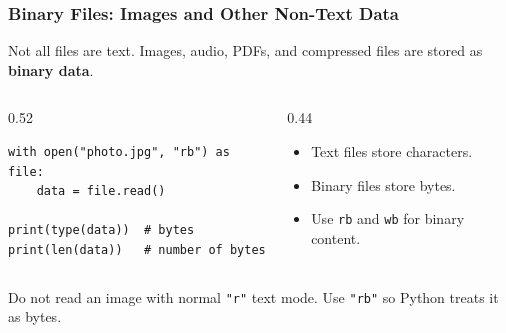 \documentclass[aspectratio=169,10pt]{beamer}
\newcommand{\keyword}[1]{\textcolor{PrimaryBlue}{\textbf{#1}}}
\newcommand{\codeword}[1]{\texttt{#1}}
\begin{document}
\begin{frame}[fragile]
\frametitle{Binary Files: Images and Other Non-Text Data}
\small
Not all files are text. Images, audio, PDFs, and compressed files are stored as \keyword{binary data}.

\vspace{0.15cm}
\begin{columns}[T,totalwidth=0.96\textwidth]
\begin{column}{0.52\textwidth}
\begin{lstlisting}[style=pycode]
with open("photo.jpg", "rb") as file:
    data = file.read()

print(type(data))  # bytes
print(len(data))   # number of bytes
\end{lstlisting}
\end{column}
\begin{column}{0.44\textwidth}
\begin{tcolorbox}[lecturebox,title=Text vs. binary]
\begin{itemize}\setlength\itemsep{0.08cm}
  \item Text files store characters.
  \item Binary files store bytes.
  \item Use \codeword{rb} and \codeword{wb} for binary content.
\end{itemize}
\end{tcolorbox}
\end{column}
\end{columns}

\vspace{0.15cm}
\begin{tcolorbox}[lecturebox,title=Beginner warning]
Do not read an image with normal \codeword{"r"} text mode. Use \codeword{"rb"} so Python treats it as bytes.
\end{tcolorbox}
\end{frame}
\end{document}
